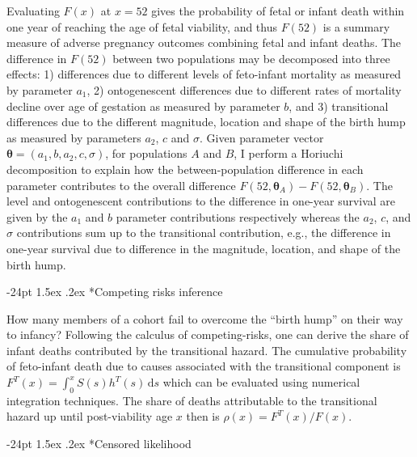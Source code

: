 \documentclass[10pt, twoside]{article}
\makeatletter
\renewcommand\subsection{\@startsection{subsection}{2}{\z@}%
                                     {-24pt}%
                                     {1.5ex \@plus .2ex}%
                                     {\normalfont\normalsize\bfseries}}
\makeatother
\begin{document}
Evaluating \(F(x)\) at \(x=52\) gives the probability of fetal or infant death within one year of reaching the age of fetal viability, and thus \(F(52)\) is a summary measure of adverse pregnancy outcomes combining fetal and infant deaths. The difference in \(F(52)\) between two populations may be decomposed into three effects: 1) differences due to different levels of feto-infant mortality as measured by parameter \(a_1\), 2) ontogenescent differences due to different rates of mortality decline over age of gestation as measured by parameter \(b\), and 3) transitional differences due to the different magnitude, location and shape of the birth hump as measured by parameters \(a_2\), \(c\) and \(\sigma\). Given parameter vector \(\boldsymbol{\theta} = (a_1, b, a_2, c, \sigma)\), for populations \(A\) and \(B\), I perform a Horiuchi decomposition \citep{Horiuchi2008} to explain how the between-population difference in each parameter contributes to the overall difference \(F(52,\boldsymbol{\theta}_A) - F(52,\boldsymbol{\theta}_B)\). The level and ontogenescent contributions to the difference in one-year survival are given by the \(a_1\) and \(b\) parameter contributions respectively whereas the \(a_2\), \(c\), and \(\sigma\) contributions sum up to the transitional contribution, e.g., the difference in one-year survival due to difference in the magnitude, location, and shape of the birth hump.

\hypertarget{competing-risks-inference}{%
\subsection*{Competing risks inference}\label{competing-risks-inference}}

How many members of a cohort fail to overcome the ``birth hump'' on their way to infancy? Following the calculus of competing-risks, one can derive the share of infant deaths contributed by the transitional hazard. The cumulative probability of feto-infant death due to causes associated with the transitional component is \(F^T(x) = \int_{0}^{x} S(s)h^T(s)\,\mathrm{d}s\)
which can be evaluated using numerical integration techniques. The share of deaths attributable to the transitional hazard up until post-viability age \(x\) then is \(\rho(x) = F^T(x)/F(x)\).

\hypertarget{censored-likelihood}{%
\subsection*{Censored likelihood}\label{censored-likelihood}}
\end{document}
